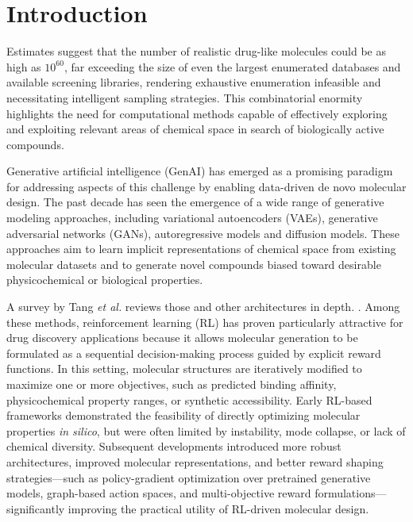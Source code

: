 \section{Introduction}
Estimates suggest that the number of realistic drug-like molecules could be as high as $10^{60}$, far exceeding the size of even the largest enumerated databases and available screening libraries, rendering exhaustive enumeration infeasible and necessitating intelligent sampling strategies\cite{Bohacek1996ThePerspective,Polishchuk2013EstimationData,Walters2019VirtualLibraries}. This combinatorial enormity highlights the need for computational methods capable of effectively exploring and exploiting relevant areas of chemical space in search of biologically active compounds.

Generative artificial intelligence (GenAI) has emerged as a promising paradigm for addressing aspects of this challenge by enabling data-driven de novo molecular design. The past decade has seen the emergence of a wide range of generative modeling approaches, including variational autoencoders (VAEs)\cite{Gomez-Bombarelli2018AutomaticMolecules,Oliveira2022MolecularAutoencoder,Ochiai2023VariationalComplexity},
generative adversarial networks (GANs)\cite{Lee2021GenerativeDesign,Macedo2024MedGAN:Design,Sun2025GenerativeChallenges,Xu2025GenerationNetworks},
autoregressive models\cite{Segler2017GeneratingNetworks,Gebauer2022InverseNetworks} and  
diffusion models\cite{Morehead2024Geometry-completeOptimization}. These approaches aim to learn implicit representations of chemical space from existing molecular datasets and to generate novel compounds biased toward desirable physicochemical or biological properties.

A survey by Tang \textit{et al.} reviews those and other architectures in depth.
\cite{Tang2024AGeneration}. Among these methods, reinforcement learning (RL) has proven particularly attractive for drug discovery applications because it allows molecular generation to be formulated as a sequential decision-making process guided by explicit reward functions. In this setting, molecular structures are iteratively modified to maximize one or more objectives, such as predicted binding affinity, physicochemical property ranges, or synthetic accessibility. Early RL-based frameworks demonstrated the feasibility of directly optimizing molecular properties \textit{in silico}, but were often limited by instability, mode collapse, or lack of chemical diversity\cite{Walters2020AssessingChemistry}. Subsequent developments introduced more robust architectures, improved molecular representations, and better reward shaping strategies—such as policy-gradient optimization over pretrained generative models, graph-based action spaces, and multi-objective reward formulations—significantly improving the practical utility of RL-driven molecular design\cite{Olivecrona2017MolecularLearning,Zhou2019OptimizationLearning,Blaschke2020Memory-assistedDesign}.

